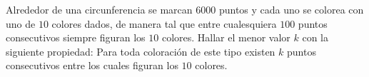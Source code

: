 Alrededor de una circunferencia se marcan $6000$ puntos y cada uno se colorea con uno de $10$ colores dados, de manera tal que entre cualesquiera $100$ puntos consecutivos siempre figuran los $10$ colores. Hallar el menor valor $k$ con la siguiente propiedad: Para toda coloración de este tipo existen $k$ puntos consecutivos entre los cuales figuran los $10$ colores.
